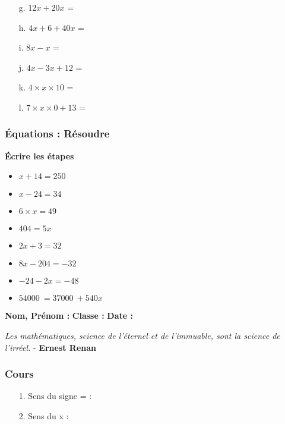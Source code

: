 \begin{enumerate}
  \item[g.] $12x + 20x$ = \dotfill 
  \item[h.] $4x + 6 + 40x$ = \dotfill 
  \item[i.] $8x - x$ = \dotfill 
  \item[j.] $4x - 3x + 12$ = \dotfill 
  \item[k.] $4 \times x \times 10$ = \dotfill 
  \item[l.] $7 \times x \times 0 + 13$ = \dotfill 
\end{enumerate}

\subsubsection*{Équations : Résoudre}
\textbf{Écrire les étapes}

\begin{itemize}[label={$\bullet$}]
\item $x + 14 = 250$
\item $x - 24 = 34$
\item $6 \times x = 49$
\item $404 = 5x$
\item $2x + 3 = 32$
\item $8x - 204 = -32$
\item $-24 - 2x = -48$
\item $\SI{54000}{} = \SI{37000}{} + 540x$
\end{itemize}

\newpage 


\textbf{Nom, Prénom :} \hspace{8cm} \textbf{Classe :} \hspace{3cm} \textbf{Date :}\\

\begin{center}
  \textit{Les mathématiques, science de l’éternel et de l’immuable, sont la science de l’irréel.}  - \textbf{Ernest Renan}
\end{center}

\subsubsection*{Cours}

\begin{enumerate}
	\item[1.] Sens du signe = : \dotfill 
	\item[2.] Sens du x :  \dotfill  
\end{enumerate}

